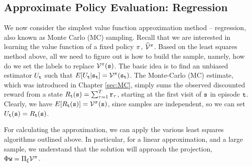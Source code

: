 

\subsection{Approximate Policy Evaluation: Regression}

We now consider the simplest value function approximation method -- regression, also known as Monte Carlo (MC) sampling. Recall that we are interested in learning the value function of a fixed policy $\pi$, $\widehat{\mathcal{V}}^{\pi}$.
Based on the least squares method above, all we need to figure out is how to build the sample, namely, how do we set the labels to
replace $\mathcal{V}^\pi ({\tt s})$. The basic idea is to find an
unbiased estimator $U_{\tt t}$ such that $E[U_{\tt t}
|{\tt s}_{\tt t}]=\mathcal{V}^\pi({\tt s}_{\tt t})$. The Monte-Carlo (MC) estimate, which was introduced in Chapter \ref{sec:MC}, simply sums the observed discounted reward from a state $R_{\tt t}({\tt s})=\sum_{\tau=1}^T
{\tt r}_\tau$, starting at the first visit of ${\tt s}$ in episode
${\tt t}$. Clearly, we have
$E[R_{\tt t}({\tt s})]=\mathcal{V}^\pi({\tt s})$, since samples are
independent, so we can set $U_{\tt t}({\tt s})=R_{\tt t}({\tt s})$. 


For calculating the approximation, we can apply the various least squares algorithms outlined above. In particular, for a linear approximation, and a large sample, we understand that the solution will approach the projection, $\Phi {\tt w} = \Pi_\xi \mathcal{V}^\pi$.

